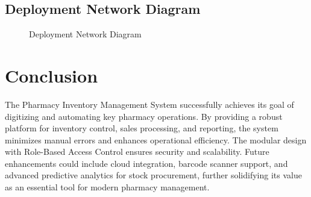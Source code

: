 \documentclass[12pt,a4paper]{article}
\begin{document}
\subsection{Deployment Network Diagram}
\begin{figure}[H]
\centering
{}
\caption{Deployment Network Diagram}
\end{figure}

\section{Conclusion}
The Pharmacy Inventory Management System successfully achieves its goal of digitizing and automating key pharmacy operations. By providing a robust platform for inventory control, sales processing, and reporting, the system minimizes manual errors and enhances operational efficiency. The modular design with Role-Based Access Control ensures security and scalability. Future enhancements could include cloud integration, barcode scanner support, and advanced predictive analytics for stock procurement, further solidifying its value as an essential tool for modern pharmacy management.
\end{document}
